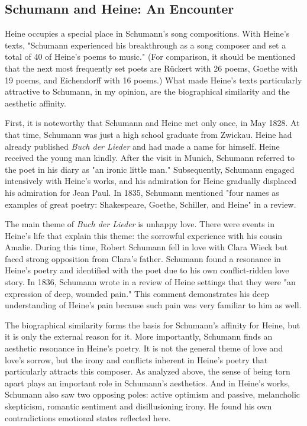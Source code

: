\documentclass[10pt,a4paper,twocolumn]{rho}
\begin{document}
\subsection{Schumann and Heine: An Encounter}

Heine occupies a special place in Schumann's song compositions. With Heine's texts, "Schumann experienced his breakthrough as a song composer and set a total of 40 of Heine's poems to music." (For comparison, it should be mentioned that the next most frequently set poets are Rückert with 26 poems, Goethe with 19 poems, and Eichendorff with 16 poems.) What made Heine's texts particularly attractive to Schumann, in my opinion, are the biographical similarity and the aesthetic affinity.

First, it is noteworthy that Schumann and Heine met only once, in May 1828. At that time, Schumann was just a high school graduate from Zwickau. Heine had already published \textit{Buch der Lieder} and had made a name for himself. Heine received the young man kindly. After the visit in Munich, Schumann referred to the poet in his diary as "an ironic little man." Subsequently, Schumann engaged intensively with Heine's works, and his admiration for Heine gradually displaced his admiration for Jean Paul. In 1835, Schumann mentioned "four names as examples of great poetry: Shakespeare, Goethe, Schiller, and Heine" in a review.

The main theme of \textit{Buch der Lieder} is unhappy love. There were events in Heine's life that explain this theme: the sorrowful experience with his cousin Amalie. During this time, Robert Schumann fell in love with Clara Wieck but faced strong opposition from Clara's father. Schumann found a resonance in Heine's poetry and identified with the poet due to his own conflict-ridden love story. In 1836, Schumann wrote in a review of Heine settings that they were "an expression of deep, wounded pain." This comment demonstrates his deep understanding of Heine's pain because such pain was very familiar to him as well.

The biographical similarity forms the basis for Schumann's affinity for Heine, but it is only the external reason for it. More importantly, Schumann finds an aesthetic resonance in Heine's poetry. It is not the general theme of love and love's sorrow, but the irony and conflicts inherent in Heine's poetry that particularly attracts this composer. As analyzed above, the sense of being torn apart plays an important role in Schumann's aesthetics. And in Heine's works, Schumann also saw two opposing poles: active optimism and passive, melancholic skepticism, romantic sentiment and disillusioning irony. He found his own contradictions emotional states reflected here.
\end{document}
